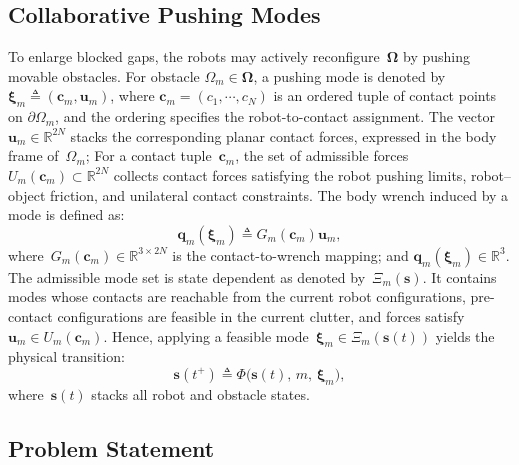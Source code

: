 \subsection{Collaborative Pushing Modes}\label{ss:interaction_mode}
To enlarge blocked gaps, the robots may actively
reconfigure~$\boldsymbol{\Omega}$ by pushing movable obstacles. For obstacle
$\Omega_m\in\boldsymbol{\Omega}$, a pushing mode is denoted by
$\boldsymbol{\xi}_m\triangleq(\mathbf{c}_m,\mathbf{u}_m)$, where
$\mathbf{c}_m=(c_1,\cdots,c_N)$ is an ordered tuple of contact points on
$\partial\Omega_m$, and the ordering specifies the robot-to-contact assignment.
The vector~$\mathbf{u}_m\in\mathbb{R}^{2N}$ stacks the corresponding planar
contact forces, expressed in the body frame of~$\Omega_m$; 
For a contact tuple~$\mathbf{c}_m$, the set of admissible forces
${U}_m(\mathbf{c}_m)\subset\mathbb{R}^{2N}$ collects contact forces
satisfying the robot pushing limits, robot--object friction, and unilateral
contact constraints. The body wrench induced by a mode is defined as:
\begin{equation}
\mathbf{q}_m(\boldsymbol{\xi}_m)
\triangleq
G_m(\mathbf{c}_m)\mathbf{u}_m,
\label{eq:contact_wrench_map}
\end{equation}
where~$G_m(\mathbf{c}_m)\in\mathbb{R}^{3\times 2N}$ is the contact-to-wrench mapping;
and $\mathbf{q}_m(\boldsymbol{\xi}_m)\in\mathbb{R}^3$.
The admissible mode set is state dependent as denoted by~$\Xi_m(\mathbf{s})$.
It contains modes whose contacts are reachable from the
current robot configurations, pre-contact configurations are feasible in
the current clutter, and forces satisfy
$\mathbf{u}_m\in{U}_m(\mathbf{c}_m)$. Hence, applying a feasible
mode~$\boldsymbol{\xi}_m\in\Xi_m(\mathbf{s}(t))$ yields the physical
transition:
\begin{equation}\label{eq:transition}
  \mathbf{s}(t^+)\triangleq
  \Phi\big(\mathbf{s}(t),\,m,\,\boldsymbol{\xi}_m\big),
\end{equation}
where~$\mathbf{s}(t)$ stacks all robot and obstacle states.


\subsection{Problem Statement}\label{subsec:objective}

